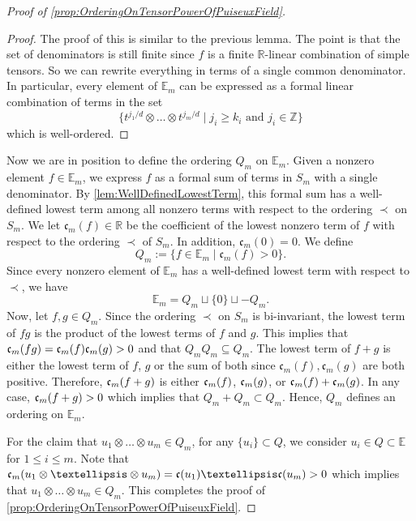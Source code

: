 \documentclass[10pt,a4paper]{amsart}
\begin{document}
\begin{proof}[Proof of \cref{prop:OrderingOnTensorPowerOfPuiseuxField}]
    \begin{proof}
        The proof of this is similar to the previous lemma. The point is that the set of denominators is still finite since $f$ is a finite $\mathbb{R}$-linear combination of simple tensors. So we can rewrite everything in terms of a single common denominator. In particular, every element of $\mathbb{E}_m$ can be expressed as a formal linear combination of terms in the set 
        \[
        \{ t^{j_1/d} \otimes \dots \otimes t^{j_m/d} \mid j_i \geq k_i \text{ and } j_i \in \mathbb{Z}\}
        \] 
        which is well-ordered. 
    \end{proof}

    Now we are in position to define the ordering $Q_m$ on $\mathbb{E}_m$. Given a nonzero element $f\in \mathbb{E}_m$, we express $f$ as a formal sum of terms in $S_m$ with a single denominator. By \cref{lem:WellDefinedLowestTerm}, this formal sum has a well-defined lowest term among all nonzero terms with respect to the ordering $\prec $ on $S_m$. We let $\mathfrak{c}_m(f) \in \mathbb{R}$ be the coefficient of the lowest nonzero term of $f$ with respect to the ordering $\prec$ of $S_m$. In addition, $\mathfrak{c}_m(0)= 0$. We define
    \[
    Q_m := \{f \in \mathbb{E}_m \mid \mathfrak{c}_m(f) > 0 \}. 
    \]
    Since every nonzero element of $\mathbb{E}_m$ has a well-defined lowest term with respect to $\prec$, we have 
    \[\mathbb{E}_m = Q_m \sqcup\{0\} \sqcup -Q_m.\] 
    Now, let $f,g \in Q_m$. Since the ordering $\prec$ on $S_m$ is bi-invariant, the lowest term of $fg$ is the product of the lowest terms of $f$ and $g$. This implies that $\frak{c}_m(fg) = \frak{c}_m(f)\frak{c}_m(g) >0$ and that $Q_m Q_m \subseteq Q_m$. The lowest term of $f+g$ is either the lowest term of $f$, $g$ or the sum of both since $\mathfrak{c}_m(f), \mathfrak{c}_m(g)$ are both positive. Therefore, $\frak{c}_m(f+g)$ is either $\frak{c}_m(f)$, $\frak{c}_m(g)$, or $\frak{c}_m(f)+\frak{c}_m(g)$. In any case, $\frak{c}_m(f+g) >0$ which implies that $Q_m + Q_m \subset Q_m$. Hence, $Q_m$ defines an ordering on $\mathbb{E}_m$. 

    For the claim that $u_1\otimes \dots \otimes u_m \in  Q_m$, for any $ \{u_i\}\subset Q$, we consider $u_i \in Q \subset \mathbb{E}$ for $1\leq i \leq m$. Note that $\mathfrak{c}_m(u_1\otimes \dots \otimes u_m) = \frak{c}(u_1)\dots\frak{c}(u_m) >0$ which implies that $u_1\otimes \dots \otimes u_m \in Q_m$. This completes the proof of \cref{prop:OrderingOnTensorPowerOfPuiseuxField}.
\end{proof}
\end{document}
